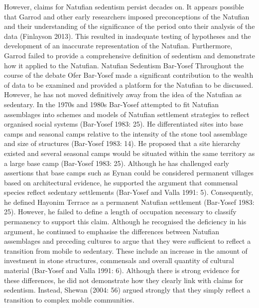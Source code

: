 \documentclass[%
	]{ijsra}
\begin{document}
However, claims for Natufian sedentism persist decades on. It appears possible that Garrod and other early researchers imposed preconceptions of the Natufian and their understanding of the significance of the period onto their analysis of the data (Finlayson 2013). This resulted in inadequate testing of hypotheses and the development of an inaccurate representation of the Natufian. Furthermore, Garrod failed to provide a comprehensive definition of sedentism and demonstrate how it applied to the Natufian.
Natufian Sedentism
Bar-Yosef
Throughout the course of the debate Ofer Bar-Yosef made a significant contribution to the wealth of data to be examined and provided a platform for the Natufian to be discussed. However, he has not moved definitively away from the idea of the Natufian as sedentary. In the 1970s and 1980s Bar-Yosef attempted to fit Natufian assemblages into schemes and models of Natufian settlement strategies to reflect organised social systems (Bar-Yosef 1983: 25). He differentiated sites into base camps and seasonal camps relative to the intensity of the stone tool assemblage and size of structures (Bar-Yosef 1983: 14). He proposed that a site hierarchy existed and several seasonal camps would be situated within the same territory as a large base camp (Bar-Yosef 1983: 25). Although he has challenged early assertions that base camps such as Eynan could be considered permanent villages based on architectural evidence, he supported the argument that commensal species reflect sedentary settlements (Bar-Yosef and Valla 1991: 5). Consequently, he defined Hayonim Terrace as a permanent Natufian settlement (Bar-Yosef 1983: 25).  However, he failed to define a length of occupation necessary to classify permanency to support this claim. Although he recognised the deficiency in his argument, he continued to emphasise the differences between Natufian assemblages and preceding cultures to argue that they were sufficient to reflect a transition from mobile to sedentary. These include an increase in the amount of investment in stone structures, commensals and overall quantity of cultural material (Bar-Yosef and Valla 1991: 6). Although there is strong evidence for these differences, he did not demonstrate how they clearly link with claims for sedentism. Instead, Shewan (2004: 56) argued strongly that they simply reflect a transition to complex mobile communities. 
\end{document}
